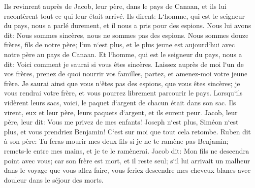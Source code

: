 \verse Ils revinrent auprès de Jacob, leur père, dans le pays de Canaan, et ils lui racontèrent tout ce qui leur était arrivé. Ils dirent: 
\verse L`homme, qui est le seigneur du pays, nous a parlé durement, et il nous a pris pour des espions. 
\verse Nous lui avons dit: Nous sommes sincères, nous ne sommes pas des espions. 
\verse Nous sommes douze frères, fils de notre père; l`un n`est plus, et le plus jeune est aujourd`hui avec notre père au pays de Canaan. 
\verse Et l`homme, qui est le seigneur du pays, nous a dit: Voici comment je saurai si vous êtes sincères. Laissez auprès de moi l`un de vos frères, prenez de quoi nourrir vos familles, partez, et amenez-moi votre jeune frère. 
\verse Je saurai ainsi que vous n`êtes pas des espions, que vous êtes sincères; je vous rendrai votre frère, et vous pourrez librement parcourir le pays. 
\verse Lorsqu`ils vidèrent leurs sacs, voici, le paquet d`argent de chacun était dans son sac. Ils virent, eux et leur père, leurs paquets d`argent, et ils eurent peur. 
\verse Jacob, leur père, leur dit: Vous me privez de mes enfants! Joseph n`est plus, Siméon n`est plus, et vous prendriez Benjamin! C`est sur moi que tout cela retombe. 
\verse Ruben dit à son père: Tu feras mourir mes deux fils si je ne te ramène pas Benjamin; remets-le entre mes mains, et je te le ramènerai. 
\verse Jacob dit: Mon fils ne descendra point avec vous; car son frère est mort, et il reste seul; s`il lui arrivait un malheur dans le voyage que vous allez faire, vous feriez descendre mes cheveux blancs avec douleur dans le séjour des morts. 

